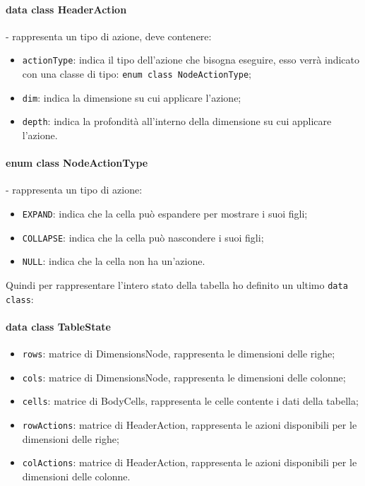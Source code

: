 \paragraph*{data class HeaderAction}- rappresenta un tipo di azione, deve contenere:
\begin{itemize}
	\item \verb|actionType|:  indica il tipo dell'azione che bisogna eseguire, esso verrà indicato con una classe di tipo: \verb|enum class NodeActionType|;
	\item \verb|dim|: indica la dimensione su cui applicare l'azione;
	\item \verb|depth|: indica la profondità all'interno della dimensione su cui applicare l'azione.
\end{itemize}

\paragraph*{enum class NodeActionType}- rappresenta un tipo di azione:
\begin{itemize}
	\item \verb|EXPAND|:  indica che la cella può espandere per mostrare i suoi figli;
	\item \verb|COLLAPSE|: indica che la cella può nascondere i suoi figli;
	\item \verb|NULL|: indica che la cella non ha un'azione.
\end{itemize}

Quindi per rappresentare l'intero stato della tabella ho definito un ultimo \verb|data class|:
\paragraph*{data class TableState}
\begin{itemize}
	\item \verb|rows|: matrice di DimensionsNode, rappresenta le dimensioni delle righe;
	\item \verb|cols|: matrice di DimensionsNode, rappresenta le dimensioni delle colonne;
	\item \verb|cells|: matrice di BodyCells, rappresenta le celle contente i dati della tabella;
	\item \verb|rowActions|: matrice di HeaderAction, rappresenta le azioni disponibili per le dimensioni delle righe;
	\item \verb|colActions|:  matrice di HeaderAction, rappresenta le azioni disponibili per le dimensioni delle colonne.
\end{itemize}

